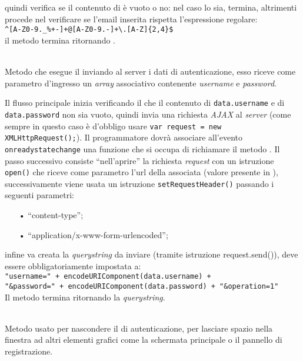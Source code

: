 \begin{description}
	quindi verifica se il contenuto di  è vuoto o no: nel caso lo sia, termina, altrimenti procede nel verificare se l'email inserita rispetta l'espressione regolare:\\
	
	\verb|^[A-Z0-9._%+-]+@[A-Z0-9.-]+\.[A-Z]{2,4}$|
	\\
	
	il metodo termina ritornando .	
	
	\item{}\\
	Metodo che esegue il  inviando al server i dati di autenticazione, esso riceve come parametro d'ingresso un \textit{array} associativo contenente \textit{username} e \textit{password}.
	
	Il flusso principale inizia verificando il che il contenuto di \texttt{data.username} e di \texttt{data.password} non sia vuoto, quindi invia una richiesta \textit{AJAX} al \textit{server} (come sempre in questo caso è d'obbligo usare \verb|var request = new XMLHttpRequest();|).
	Il programmatore dovrà associare all'evento \texttt{onreadystatechange} una funzione che si occupa di richiamare il metodo . Il passo successivo consiste ``nell'aprire'' la richiesta \textit{request} con un istruzione \texttt{open()} che riceve come parametro l'url della  associata (valore presente in ), successivamente viene usata un istruzione \texttt{setRequestHeader()} passando i seguenti parametri:
	\begin{itemize}
		\item[•] ``content-type'';
		\item[•] ``application/x-www-form-urlencoded'';
	\end{itemize}
	infine va creata la \textit{querystring} da inviare (tramite istruzione request.send()), deve essere obbligatoriamente impostata a:\\
	
	\verb|"username=" + encodeURIComponent(data.username) +|\\ \verb|"&password=" + encodeURIComponent(data.password) + "&operation=1"|\\
	
	Il metodo termina ritornando la \textit{querystring}.

	\item{}\\
	Metodo usato per nascondere il  di autenticazione, per lasciare spazio nella finestra ad altri elementi grafici come la schermata principale o il pannello di registrazione.
	

\end{description}
